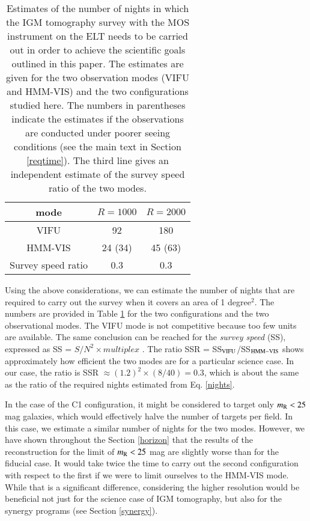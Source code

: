\documentclass{aa}
\begin{document}
\begin{table}
\begin{center}
\caption{Estimates of the number of nights in which the IGM tomography survey with the MOS instrument on the ELT needs to be carried out in order to achieve the scientific goals outlined in this paper. The estimates are given for the two observation modes (VIFU and HMM-VIS) and the two configurations studied here. The numbers in parentheses indicate the estimates if the observations are conducted under poorer seeing conditions (see the main text in Section \ref{reqtime}). The third line gives an independent estimate of the survey speed ratio of the two modes.}
\label{Tab:survey}
\renewcommand{\arraystretch}{1.3}
\begin{tabular}{ c c c} \hline \hline
             mode & $R=1000$ & $R=2000$  \\ \hline
          VIFU   & 92     &  180\\
         HMM-VIS & 24 (34) &  45 (63)\\
         \hline
         Survey speed ratio & 0.3 & 0.3\\
  \hline
\end{tabular}
\end{center}
\end{table}

Using the above considerations, we can estimate the number of nights that are required to carry out the survey when it covers an area of 1 degree$^2$. The numbers are provided in Table \ref{Tab:survey} for the two configurations and the two observational modes. The VIFU mode is not competitive because too few units are available. The same conclusion can be reached for the {\it \textup{survey speed}} (SS), expressed as SS = $S/N^{2}\times multiplex$ \citep{Puech2018}. The ratio SSR = SS$_{\rm VIFU}$/SS$_{\rm HMM-VIS}$ shows approximately how efficient the two modes are for a particular science case. In our case, the ratio is SSR $\approx \left( 1.2\right)^2 \times (8/40) = 0.3$, which is about the same as the ratio of the required nights estimated from Eq. \ref{nights}.

In the case of the C1 configuration, it might be considered to target only $m_{\rm R} < 25$ mag galaxies, which would effectively halve the number of targets per field. In this case, we estimate a similar number of nights for the two modes. However, we have shown throughout the Section \ref{horizon} that the results of the reconstruction for the limit of $m_{\rm R}< 25$ mag are slightly worse than for the fiducial case. It would take twice the time to carry out the second configuration with respect to the first if we were to limit ourselves to the HMM-VIS mode. While that is a significant difference, considering the higher resolution would be beneficial not just for the science case of IGM tomography, but also for the synergy programs (see Section \ref{synergy}).
\end{document}
